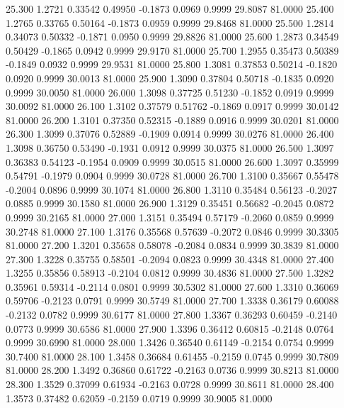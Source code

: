   25.300   1.2721   0.33542   0.49950  -0.1873   0.0969   0.9999  29.8087  81.0000
  25.400   1.2765   0.33765   0.50164  -0.1873   0.0959   0.9999  29.8468  81.0000
  25.500   1.2814   0.34073   0.50332  -0.1871   0.0950   0.9999  29.8826  81.0000
  25.600   1.2873   0.34549   0.50429  -0.1865   0.0942   0.9999  29.9170  81.0000
  25.700   1.2955   0.35473   0.50389  -0.1849   0.0932   0.9999  29.9531  81.0000
  25.800   1.3081   0.37853   0.50214  -0.1820   0.0920   0.9999  30.0013  81.0000
  25.900   1.3090   0.37804   0.50718  -0.1835   0.0920   0.9999  30.0050  81.0000
  26.000   1.3098   0.37725   0.51230  -0.1852   0.0919   0.9999  30.0092  81.0000
  26.100   1.3102   0.37579   0.51762  -0.1869   0.0917   0.9999  30.0142  81.0000
  26.200   1.3101   0.37350   0.52315  -0.1889   0.0916   0.9999  30.0201  81.0000
  26.300   1.3099   0.37076   0.52889  -0.1909   0.0914   0.9999  30.0276  81.0000
  26.400   1.3098   0.36750   0.53490  -0.1931   0.0912   0.9999  30.0375  81.0000
  26.500   1.3097   0.36383   0.54123  -0.1954   0.0909   0.9999  30.0515  81.0000
  26.600   1.3097   0.35999   0.54791  -0.1979   0.0904   0.9999  30.0728  81.0000
  26.700   1.3100   0.35667   0.55478  -0.2004   0.0896   0.9999  30.1074  81.0000
  26.800   1.3110   0.35484   0.56123  -0.2027   0.0885   0.9999  30.1580  81.0000
  26.900   1.3129   0.35451   0.56682  -0.2045   0.0872   0.9999  30.2165  81.0000
  27.000   1.3151   0.35494   0.57179  -0.2060   0.0859   0.9999  30.2748  81.0000
  27.100   1.3176   0.35568   0.57639  -0.2072   0.0846   0.9999  30.3305  81.0000
  27.200   1.3201   0.35658   0.58078  -0.2084   0.0834   0.9999  30.3839  81.0000
  27.300   1.3228   0.35755   0.58501  -0.2094   0.0823   0.9999  30.4348  81.0000
  27.400   1.3255   0.35856   0.58913  -0.2104   0.0812   0.9999  30.4836  81.0000
  27.500   1.3282   0.35961   0.59314  -0.2114   0.0801   0.9999  30.5302  81.0000
  27.600   1.3310   0.36069   0.59706  -0.2123   0.0791   0.9999  30.5749  81.0000
  27.700   1.3338   0.36179   0.60088  -0.2132   0.0782   0.9999  30.6177  81.0000
  27.800   1.3367   0.36293   0.60459  -0.2140   0.0773   0.9999  30.6586  81.0000
  27.900   1.3396   0.36412   0.60815  -0.2148   0.0764   0.9999  30.6990  81.0000
  28.000   1.3426   0.36540   0.61149  -0.2154   0.0754   0.9999  30.7400  81.0000
  28.100   1.3458   0.36684   0.61455  -0.2159   0.0745   0.9999  30.7809  81.0000
  28.200   1.3492   0.36860   0.61722  -0.2163   0.0736   0.9999  30.8213  81.0000
  28.300   1.3529   0.37099   0.61934  -0.2163   0.0728   0.9999  30.8611  81.0000
  28.400   1.3573   0.37482   0.62059  -0.2159   0.0719   0.9999  30.9005  81.0000
